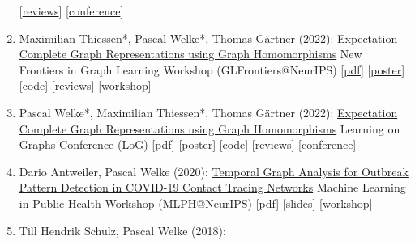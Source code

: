 \documentclass{scrartcl}
\begin{document}
\begin{enumerate}
{[\href{https://openreview.net/forum?id=aisVQy6R2k}{reviews}]
[\href{https://logconference.org}{conference}]
}
\item
\label{thiessen2022expectation}
Maximilian Thiessen*, Pascal Welke*, Thomas Gärtner (2022):\newline
\href{https://pwelke.github.io/publications/thiessen2022glfrontiers.pdf}{Expectation Complete Graph Representations using Graph Homomorphisms}\newline
New Frontiers in Graph Learning Workshop (GLFrontiers@NeurIPS)\newline
{\footnotesize
[\href{https://pwelke.github.io/publications/thiessen2022glfrontiers.pdf}{pdf}]
[\href{https://pwelke.github.io/publications/expectation_complete_poster_neurips.pdf}{poster}]
[\href{https://github.com/pwelke/homcount}{code}]
[\href{https://openreview.net/forum?id=Zf-Mn6xzD2B}{reviews}]
[\href{https://glfrontiers.github.io/}{workshop}]
}
\item
\label{welke2022expectation}
Pascal Welke*, Maximilian Thiessen*, Thomas Gärtner (2022):\newline
\href{https://pwelke.github.io/publications/welke2022log.pdf}{Expectation Complete Graph Representations using Graph Homomorphisms}\newline
Learning on Graphs Conference (LoG)\newline
{\footnotesize
[\href{https://pwelke.github.io/publications/welke2022log.pdf}{pdf}]
[\href{https://pwelke.github.io/publications/expectation_complete_poster_neurips.pdf}{poster}]
[\href{https://github.com/pwelke/homcount}{code}]
[\href{https://openreview.net/forum?id=8GJyW4i2oST}{reviews}]
[\href{http://log2022.logconference.org/}{conference}]
}
\item
\label{antweiler2020temporal}
Dario Antweiler, Pascal Welke (2020):\newline
\href{https://pwelke.github.io/publications/antweiler2020temporal.pdf}{Temporal Graph Analysis for Outbreak Pattern Detection in COVID-19 Contact Tracing Networks}\newline
Machine Learning in Public Health Workshop (MLPH@NeurIPS)\newline
{\footnotesize
[\href{https://pwelke.github.io/publications/antweiler2020temporal.pdf}{pdf}]
[\href{https://pwelke.github.io/publications/antweiler2020temporal-slides.pdf}{slides}]
[\href{https://sites.google.com/nyu.edu/mlph2020/}{workshop}]
}
\item
\label{schulz2018necessity}
Till Hendrik Schulz, Pascal Welke (2018):\newline

\end{enumerate}
\end{document}
